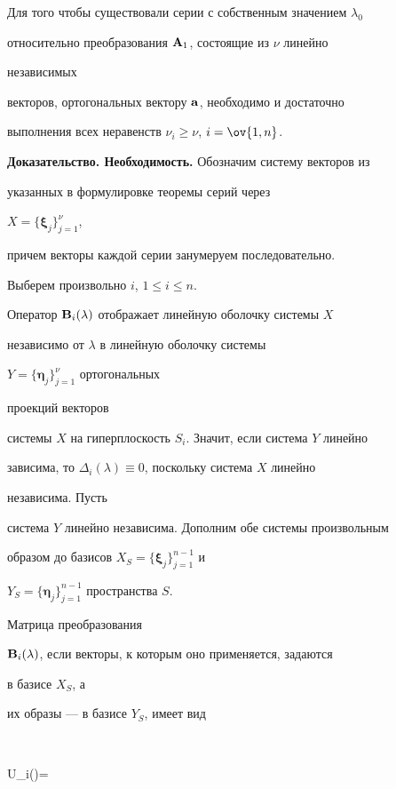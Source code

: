  


\begin{thm} 


Для того чтобы существовали серии с собственным значением $\lambda_0$ 


относительно преобразования $\bold A_1$, состоящие из $\nu$ линейно 


независимых 


векторов, ортогональных вектору $\bold a$, необходимо и достаточно 


выполнения всех неравенств $\nu_i\ge\nu$, $i=\ov{1,n}$. 


\end{thm} 


 


{\bf Доказательство. Необходимость.} Обозначим систему векторов из 


указанных в формулировке теоремы серий через


$X=\{\boldsymbol \xi_j\}^\nu_{j=1}$, 


причем векторы каждой серии занумеруем последовательно. 


Выберем произвольно $i$, $1\le i\le n$. 


Оператор $\bold B_i(\lambda)$ отображает линейную оболочку системы $X$ 


независимо от $\lambda$ в линейную оболочку системы


$Y=\{\boldsymbol\eta_j\}^\nu_{j=1}$ ортогональных 


проекций векторов 


системы $X$ на гиперплоскость $S_i$. Значит, если система $Y$ линейно 


зависима, то $\Delta_i(\lambda)\equiv0$, поскольку система $X$ линейно 


независима. Пусть 


система $Y$ линейно независима. Дополним обе системы произвольным 


образом до базисов $X_S=\{\boldsymbol\xi_j\}^{n-1}_{j=1}$ и 


$Y_S=\{\boldsymbol\eta_j\}^{n-1}_{j=1}$ пространства $S$.


Матрица преобразования 


$\bold B_i(\lambda)$, если векторы, к которым оно применяется, задаются 


в базисе $X_S$, а 


их образы --- в базисе $Y_S$, имеет вид 


$$ 


U_i(\lambda)= 


